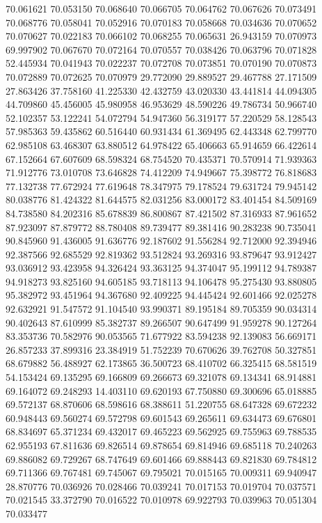 70.061621
70.053150
70.068640
70.066705
70.064762
70.067626
70.073491
70.068776
70.058041
70.052916
70.070183
70.058668
70.034636
70.070652
70.070627
70.022183
70.066102
70.068255
70.065631
26.943159
70.070973
69.997902
70.067670
70.072164
70.070557
70.038426
70.063796
70.071828
52.445934
70.041943
70.022237
70.072708
70.073851
70.070190
70.070873
70.072889
70.072625
70.070979
29.772090
29.889527
29.467788
27.171509
27.863426
37.758160
41.225330
42.432759
43.020330
43.441814
44.094305
44.709860
45.456005
45.980958
46.953629
48.590226
49.786734
50.966740
52.102357
53.122241
54.072794
54.947360
56.319177
57.220529
58.128543
57.985363
59.435862
60.516440
60.931434
61.369495
62.443348
62.799770
62.985108
63.468307
63.880512
64.978422
65.406663
65.914659
66.422614
67.152664
67.607609
68.598324
68.754520
70.435371
70.570914
71.939363
71.912776
73.010708
73.646828
74.412209
74.949667
75.398772
76.818683
77.132738
77.672924
77.619648
78.347975
79.178524
79.631724
79.945142
80.038776
81.424322
81.644575
82.031256
83.000172
83.401454
84.509169
84.738580
84.202316
85.678839
86.800867
87.421502
87.316933
87.961652
87.923097
87.879772
88.780408
89.739477
89.381416
90.283238
90.735041
90.845960
91.436005
91.636776
92.187602
91.556284
92.712000
92.394946
92.387566
92.685529
92.819362
93.512824
93.269316
93.879647
93.912427
93.036912
93.423958
94.326424
93.363125
94.374047
95.199112
94.789387
94.918273
93.825160
94.605185
93.718113
94.106478
95.275430
93.880805
95.382972
93.451964
94.367680
92.409225
94.445424
92.601466
92.025278
92.632921
91.547572
91.104540
93.990371
89.195184
89.705359
90.034314
90.402643
87.610999
85.382737
89.266507
90.647499
91.959278
90.127264
83.353736
70.582976
90.053565
71.677922
83.594238
92.139083
56.669171
26.857233
37.899316
23.384919
51.752239
70.670626
39.762708
50.327851
68.679882
56.488927
62.173865
36.500723
68.410702
66.325415
68.581519
54.153424
69.135295
69.166809
69.266673
69.321078
69.134341
68.914881
69.164072
69.248293
14.403110
69.620193
67.750880
69.300696
65.018885
69.572137
68.870606
68.598616
68.388611
51.220755
68.647328
69.672232
60.948443
69.560274
69.572798
69.601543
69.265611
69.634473
69.676801
68.834697
65.371234
69.432017
69.465223
69.562925
69.755963
69.788535
62.955193
67.811636
69.826514
69.878654
69.814946
69.685118
70.240263
69.886082
69.729267
68.747649
69.601466
69.888443
69.821830
69.784812
69.711366
69.767481
69.745067
69.795021
70.015165
70.009311
69.940947
28.870776
70.036926
70.028466
70.039241
70.017153
70.019704
70.037571
70.021545
33.372790
70.016522
70.010978
69.922793
70.039963
70.051304
70.033477
